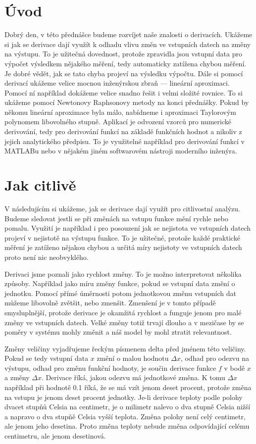 \documentclass[12pt]{article}
\begin{document}
\section*{Úvod}

Dobrý den, v této přednášce budeme rozvíjet naše znalosti o derivacích. Ukážeme si jak se derivace dají využít k odhadu vlivu změn ve vstupních datech na změny na výstupu. To je užitečná dovednost, protože zpravidla jsou vstupní data pro výpočet výsledkem nějakého měření, tedy automaticky zatížena chybou měření. Je dobré vědět, jak se tato chyba projeví na výsledku výpočtu. Dále si pomocí derivací ukážeme velice mocnou inženýrskou zbraň --- lineární aproximaci. Pomocí ní například dokážeme velice snadno řešit i velmi složité rovnice. To si ukážeme pomocí Newtonovy Raphsonovy metody na konci přednášky. Pokud by někomu lineární aproximace byla málo, nabídneme i aproximaci Taylorovým polynomem libovolného stupně. Aplikací je odvození vzorců pro numerické derivování, tedy pro derivování funkcí na základě funkčních hodnot a nikoliv z jejich analytického předpisu. To je využitelné například pro derivování funkcí v MATLABu nebo v nějakém jiném softwarovém nástroji moderního inženýra. 

\section*{Jak citlivě}

V následujícím si ukážeme, jak se derivace dají využít pro citlivostní analýzu. Budeme sledovat jestli se při změnách na vstupu funkce mění rychle nebo pomalu. Využití je například i pro posouzení jak se nejistota ve vstupních datech projeví v nejistotě na výstupu funkce. To je užitečné, protože každé praktické měření je zatíženo nějakou chybou a určitá míry nejistoty ve vstupních datech proto není nic neobvyklého.

Derivaci jsme poznali jako rychlost změny. To je možno interpretovat několika způsoby. Například jako míru změny funkce, pokud se vstupní data změní o jednotku. Pomocí přímé úměrnosti potom jednotkovou změnu vstupních dat můžeme libovolně zvětšit, nebo zmenšit. Zmenšení je v tomto případě smysluplnější, protože derivace je okamžitá rychlost a funguje jenom pro malé změny ve vstupních datech. Velké změny totiž trvají dlouho a v mezičase by se poměry v systému mohly změnit a náš model by mohl ztratit relevantnost. 

Změny veličiny vyjadřujeme řeckým písmenem delta před jménem této veličiny. 
Pokud se tedy vstupní data $x$ změní o malou hodnotu $\Delta x$, odhad pro odezvu na výstupu, odhad pro změnu funkční hodnoty, je součin derivace funkce $f$ v bodě $x$ a změny $\Delta x$. Derivace říká, jakou odezvu má jednotkové změna. K tomu $\Delta x$ například při hodnotě 0.1 říká, že se má vzít jenom deset procent, protože změna na vstupu je jenom deset procent jednotky. Je-li derivace teploty podle polohy dvacet stupňů Celsia na centimetr, je o milimetr nalevo o dva stupně Celsia nižší a napravo o dva stupňě Celsia vyšší teplota. Změna polohy není celý centimetr, ale jenom jeho desetina. Proto změna teploty nebude změna odpovídající celému centimetru, ale jenom desetinová.
\end{document}
